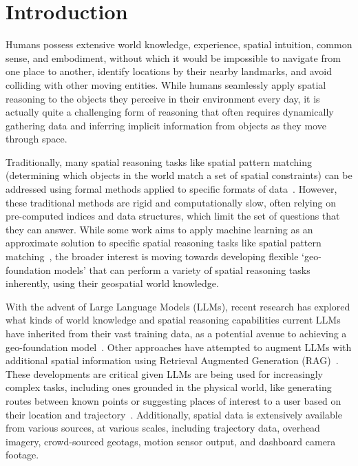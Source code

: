 \section{Introduction}
\label{section:introduction}

Humans possess extensive world knowledge, experience, spatial intuition, common sense, and embodiment, without which it would be impossible to navigate from one place to another, identify locations by their nearby landmarks, and avoid colliding with other moving entities.
While humans seamlessly apply spatial reasoning to the objects they perceive in their environment every day, it is actually quite a challenging form of reasoning that often requires dynamically gathering data and inferring implicit information from objects as they move through space.

Traditionally, many spatial reasoning tasks like spatial pattern matching (determining which objects in the world match a set of spatial constraints) can be addressed using formal methods applied to specific formats of data~\cite{Papadias1998, Schwering2014, Duckham2023,Folkers2000, Chen2019, Fang2019, Minervino2023, Osul2023, Osul2023b}.
However, these traditional methods are rigid and computationally slow, often relying on pre-computed indices and data structures, which limit the set of questions that they can answer.
While some work aims to apply machine learning as an approximate solution to specific spatial reasoning tasks like spatial pattern matching~\cite{Schneider2024, Schneider2024b}, the broader interest is moving towards developing flexible `geo-foundation models' that can perform a variety of spatial reasoning tasks inherently, using their geospatial world knowledge.

With the advent of Large Language Models (LLMs), recent research has explored what kinds of world knowledge and spatial reasoning capabilities current LLMs have inherited from their vast training data, as a potential avenue to achieving a geo-foundation model~\cite{Mai2024, Bhandari2023, Qi2023, Xie2023translating, Mooney2023,Cohn2023,Bang2023}.
Other approaches have attempted to augment LLMs with additional spatial information using Retrieval Augmented Generation (RAG)~\cite{Yu2025,Schneider2025b}. 
These developments are critical given LLMs are being used for increasingly complex tasks, including ones grounded in the physical world, like generating routes between known points or suggesting places of interest to a user based on their location and trajectory~\cite{Schneider2025,Yu2025}.
Additionally, spatial data is extensively available from various sources, at various scales, including trajectory data, overhead imagery, crowd-sourced geotags, motion sensor output, and dashboard camera footage.

